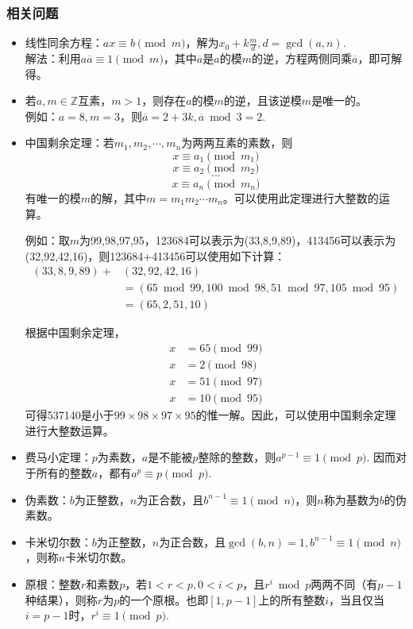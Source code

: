 \subsubsection*{相关问题}
\begin{itemize}
    \item 线性同余方程：$ax \equiv b \pmod m$，解为$x_0 + k \frac md, d = \gcd (a,n)$. \\ 解法：利用$a \overline a \equiv 1 \pmod m$，其中$\overline a$是$a$的模$m$的逆，方程两侧同乘$\overline a$，即可解得。

    \item 若$a, m \in \mathbb Z$互素，$m > 1$，则存在$a$的模$m$的逆，且该逆模$m$是唯一的。\\ 例如：$a = 8, m = 3$，则$\overline a = 2 + 3k , \overline a \bmod 3 = 2$.

    \item 中国剩余定理：若$m_1, m_2, \cdots, m_n$为两两互素的素数，则\[x \equiv a_1 \pmod {m_1} \]\[ x \equiv a_2 \pmod {m_2} \]\[ \cdots \]\[ x \equiv a_n \pmod {m_n}\]有唯一的模$m$的解，其中$m = m_1 m_2 \cdots m_n$。可以使用此定理进行大整数的运算。

    例如：取$m$为99,98,97,95，123684可以表示为(33,8,9,89)，413456可以表示为(32,92,42,16)，则123684+413456可以使用如下计算：
    \begin{align*}
        (33,8,9,89) + & (32,92,42,16) \\ &= (65 \bmod 99, 100 \bmod 98, 51 \bmod 97, 105 \bmod 95) \\ &= (65,2,51,10)
    \end{align*}
    
    根据中国剩余定理，
    \begin{align*}
        x &= 65 \pmod {99} \\ x &= 2 \pmod {98} \\
        x &= 51 \pmod {97} \\ x &= 10 \pmod {95}
    \end{align*}
    可得537140是小于$99 \times 98 \times 97 \times 95$的惟一解。因此，可以使用中国剩余定理进行大整数运算。

    \item 费马小定理：$p$为素数，$a$是不能被$p$整除的整数，则$a^{p-1} \equiv 1 \pmod p$. 因而对于所有的整数$a$，都有$a^p \equiv p \pmod p$.

    \item 伪素数：$b$为正整数，$n$为正合数，且$b^{n-1} \equiv 1 \pmod n$，则$n$称为基数为$b$的伪素数。

    \item 卡米切尔数：$b$为正整数，$n$为正合数，且$\gcd (b,n) = 1, b^{n-1} \equiv 1 \pmod n$，则称$n$卡米切尔数。

    \item 原根：整数$r$和素数$p$，若$1 < r < p, 0 < i < p$，且$r^i \bmod p$两两不同（有$p-1$种结果），则称$r$为$p$的一个原根。也即$[1,p-1]$上的所有整数$i$，当且仅当$i = p-1$时，$r^i \equiv 1 \pmod p$.
\end{itemize}

